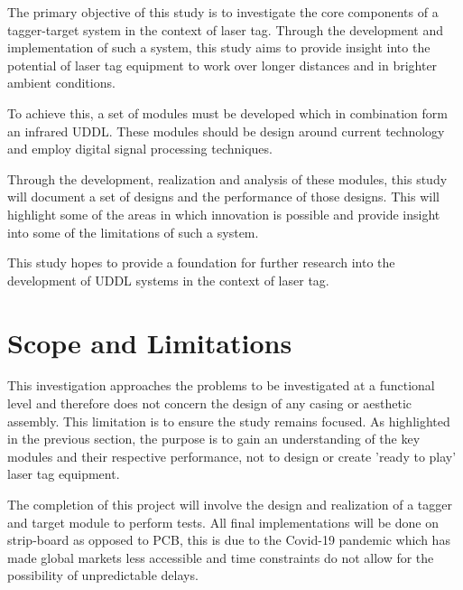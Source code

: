 

The primary objective of this study is to investigate the core components of a tagger-target system in the context of laser tag. Through the development and implementation of such a system, this study aims to provide insight into the potential of laser tag equipment to work over longer distances and in brighter ambient conditions.

To achieve this, a set of modules must be developed which in combination form an infrared UDDL. These modules should be design around current technology and employ digital signal processing techniques.

Through the development, realization and analysis of these modules, this study will document a set of designs and the performance of those designs. This will highlight some of the areas in which innovation is possible and provide insight into some of the limitations of such a system.

This study hopes to provide a foundation for further research into the development of UDDL systems in the context of laser tag.



\section{Scope and Limitations}

This investigation approaches the problems to be investigated at a functional level and therefore does not concern the design of any casing or aesthetic assembly. This limitation is to ensure the study remains focused. As highlighted in the previous section, the purpose is to gain an understanding of the key modules and their respective performance, not to design or create 'ready to play' laser tag equipment.

The completion of this project will involve the design and realization of a tagger and target module to perform tests. All final implementations will be done on strip-board as opposed to PCB, this is due to the Covid-19 pandemic which has made global markets less accessible and time constraints do not allow for the possibility of unpredictable delays.

